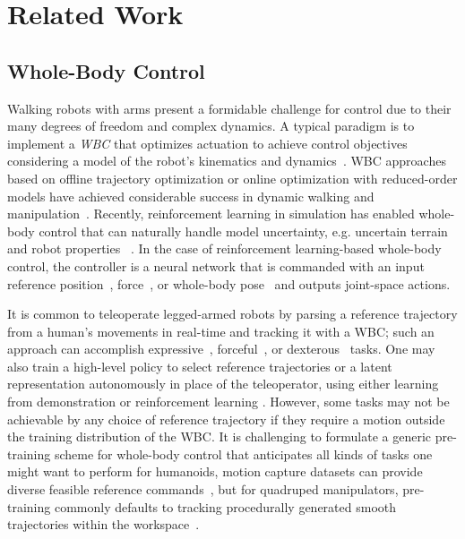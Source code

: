 \section{Related Work}
\label{sec:related_work}

\subsection{Whole-Body Control} 
Walking robots with arms present a formidable challenge for control due to their many degrees of freedom and complex dynamics. A typical paradigm is to implement a \textit{WBC} that optimizes actuation to achieve control objectives considering a model of the robot's kinematics and dynamics~\cite{sentis2006whole}. WBC approaches based on offline trajectory optimization or online optimization with reduced-order models have achieved considerable success in dynamic walking and manipulation~\cite{abe2013dynamic, bellicoso2019alma, murphy2012high, sleiman2021unified}. 
Recently, reinforcement learning in simulation has enabled whole-body control that can naturally handle model uncertainty, e.g. uncertain terrain and robot properties ~\cite{fu2023deep}. 
In the case of reinforcement learning-based whole-body control, the controller is a neural network that is commanded with an input reference position~\cite{cheng2024expressive, fu2023deep}, force~\cite{portela2024learning}, or whole-body pose~\cite{dugar2024learning, he2024learning, luo2023perpetual, luo2024smplolympics} and outputs joint-space actions.  

It is common to teleoperate legged-armed robots by parsing a reference trajectory from a human's movements in real-time and tracking it with a WBC; such an approach can accomplish expressive~\cite{cheng2024expressive}, forceful~\cite{portela2024learning}, or dexterous~\cite{ fu2024humanplushumanoidshadowingimitation} tasks. 
One may also train a high-level policy to select reference trajectories or a latent representation autonomously in place of the teleoperator, using either learning from demonstration \cite{ fu2024humanplushumanoidshadowingimitation, ha2024umi} or reinforcement learning \cite{liu2024visual, luo2024smplolympics}. 
However, some tasks may not be achievable by any choice of reference trajectory if they require a motion outside the training distribution of the WBC. 
It is challenging to formulate a generic pre-training scheme for whole-body control that anticipates all kinds of tasks one might want to perform  
for humanoids, motion capture datasets can provide diverse feasible reference commands~\cite{luo2023perpetual}, but for quadruped manipulators, pre-training commonly defaults 
to tracking procedurally generated smooth trajectories within the workspace~\cite{fu2023deep}. 

